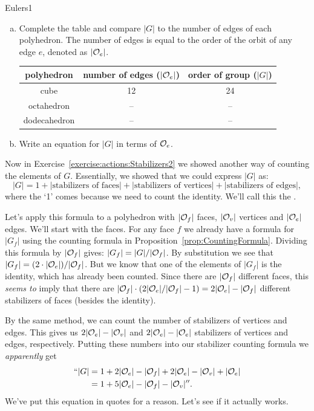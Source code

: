 \begin {exercise}{Eulers1}
\begin {enumerate}[(a)]
\item
Complete the table and compare $|G|$ to the number of edges of each polyhedron.  The number of edges is equal to the order of the orbit of any edge $e$, denoted as $|{\cal O}_e|$.

\begin{tabular}{|c | c | c|}\hline
polyhedron & number of edges ($|{\cal O}_e|$) & order of group ($|G|$)\\ \hline
cube &  12 &   24\\ \hline
octahedron & -- &--\\ \hline
dodecahedron &  --&--\\ \hline 
\end{tabular}
\item Write an equation for $|G|$ in terms of ${\cal O}_e$.
\end{enumerate}
\end {exercise}
 Now in Exercise~\ref{exercise:actions:Stabilizers2} we showed another way of counting the elements of $G$. Essentially, we showed that we could express $|G|$ as:
\[ |G| = 1 + |\text{stabilizers of faces}| + |\text{stabilizers of vertices}| + |\text{stabilizers of edges}|, \]
where the `1' comes because we need to count the identity.
We'll call this the .

Let's apply this formula to a polyhedron with $|{\cal O}_f|$ faces, $|{\cal O}_v|$ vertices and $|{\cal O}_e|$ edges.  
We'll start with the faces.   For any face $f$ we already have a formula for $|G_f|$  using the counting formula in Proposition~\ref{prop:CountingFormula}. Dividing this formula by $|{\cal O}_f|$ gives:  $|G_f|=|G|/|{\cal O}_f|$.  By substitution we see that $|G_f|=(2\cdot|{\cal O}_e|)/|{\cal O}_f|$. But we know that one of the elements of $|G_f|$ is the identity, which has already been counted.    Since there are $|{\cal O}_f|$ different faces, this\emph{ seems to} imply that there are  $|{\cal O}_f|\cdot (2|{\cal O}_e|/|{\cal O}_f|-1)= 2|{\cal O}_e|-|{\cal O}_f|$ different stabilizers of faces (besides the identity). 

 By the same method, we can count the number of stabilizers of vertices and edges. This gives us $2|{\cal O}_e|-|{\cal O}_v|$ and $2|{\cal O}_e|-|{\cal O}_e|$ stabilizers of vertices and edges, respectively.  Putting these numbers into our stabilizer counting formula we \emph {apparently} get
 \begin{align*}
``|G| &= 1+ 2|{\cal O}_e|-|{\cal O}_f|+ 2|{\cal O}_e|-|{\cal O}_v| +|{\cal O}_e| \\
&= 1+ 5|{\cal O}_e|-|{\cal O}_f|-|{\cal O}_v|''.
\end{align*}
We've put this equation in quotes for a reason.  Let's see if it actually works. 


